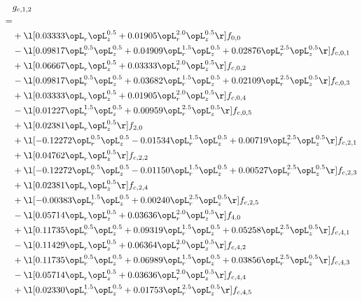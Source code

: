 \begin{alignat}{2} 
\label{eq:g_12_0} 
& g_{c,1,2} \nonumber \\ 
 = \\ 
& + \l[  0.03333 \opL_r \opL_z^{0.5} +  0.01905 \opL_r^{2.0} \opL_z^{0.5}  \r] f_{0,0} \nonumber \\ 
& - \l[  0.09817 \opL_r^{0.5} \opL_z^{0.5} +  0.04909 \opL_r^{1.5} \opL_z^{0.5} +  0.02876 \opL_r^{2.5} \opL_z^{0.5}  \r] f_{c,0,1} \nonumber \\ 
& + \l[  0.06667 \opL_r \opL_z^{0.5} +  0.03333 \opL_r^{2.0} \opL_z^{0.5}  \r] f_{c,0,2} \nonumber \\ 
& - \l[  0.09817 \opL_r^{0.5} \opL_z^{0.5} +  0.03682 \opL_r^{1.5} \opL_z^{0.5} +  0.02109 \opL_r^{2.5} \opL_z^{0.5}  \r] f_{c,0,3} \nonumber \\ 
& + \l[  0.03333 \opL_r \opL_z^{0.5} +  0.01905 \opL_r^{2.0} \opL_z^{0.5}  \r] f_{c,0,4} \nonumber \\ 
& - \l[  0.01227 \opL_r^{1.5} \opL_z^{0.5} +  0.00959 \opL_r^{2.5} \opL_z^{0.5}  \r] f_{c,0,5} \nonumber \\ 
& + \l[  0.02381 \opL_r \opL_z^{0.5}  \r] f_{2,0} \nonumber \\ 
& + \l[  -0.12272 \opL_r^{0.5} \opL_z^{0.5}   -0.01534 \opL_r^{1.5} \opL_z^{0.5} +  0.00719 \opL_r^{2.5} \opL_z^{0.5}  \r] f_{c,2,1} \nonumber \\ 
& + \l[  0.04762 \opL_r \opL_z^{0.5}  \r] f_{c,2,2} \nonumber \\ 
& + \l[  -0.12272 \opL_r^{0.5} \opL_z^{0.5}   -0.01150 \opL_r^{1.5} \opL_z^{0.5} +  0.00527 \opL_r^{2.5} \opL_z^{0.5}  \r] f_{c,2,3} \nonumber \\ 
& + \l[  0.02381 \opL_r \opL_z^{0.5}  \r] f_{c,2,4} \nonumber \\ 
& + \l[  -0.00383 \opL_r^{1.5} \opL_z^{0.5} +  0.00240 \opL_r^{2.5} \opL_z^{0.5}  \r] f_{c,2,5} \nonumber \\ 
& - \l[  0.05714 \opL_r \opL_z^{0.5} +  0.03636 \opL_r^{2.0} \opL_z^{0.5}  \r] f_{4,0} \nonumber \\ 
& + \l[  0.11735 \opL_r^{0.5} \opL_z^{0.5} +  0.09319 \opL_r^{1.5} \opL_z^{0.5} +  0.05258 \opL_r^{2.5} \opL_z^{0.5}  \r] f_{c,4,1} \nonumber \\ 
& - \l[  0.11429 \opL_r \opL_z^{0.5} +  0.06364 \opL_r^{2.0} \opL_z^{0.5}  \r] f_{c,4,2} \nonumber \\ 
& + \l[  0.11735 \opL_r^{0.5} \opL_z^{0.5} +  0.06989 \opL_r^{1.5} \opL_z^{0.5} +  0.03856 \opL_r^{2.5} \opL_z^{0.5}  \r] f_{c,4,3} \nonumber \\ 
& - \l[  0.05714 \opL_r \opL_z^{0.5} +  0.03636 \opL_r^{2.0} \opL_z^{0.5}  \r] f_{c,4,4} \nonumber \\ 
& + \l[  0.02330 \opL_r^{1.5} \opL_z^{0.5} +  0.01753 \opL_r^{2.5} \opL_z^{0.5}  \r] f_{c,4,5} \nonumber \\ 
\end{alignat} 


